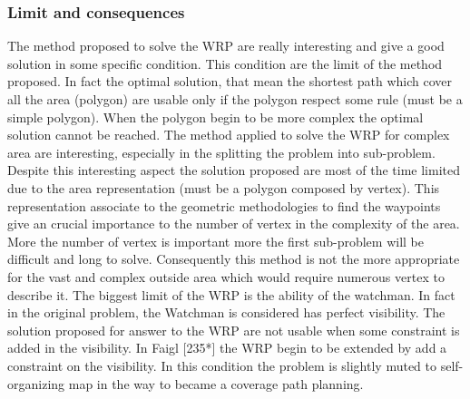 


\subsubsection{Limit and consequences}

The method proposed to solve the WRP are really interesting and give a good solution in some specific condition. This condition are the limit of the method proposed. In fact the optimal solution, that mean the shortest path which cover all the area (polygon) are usable only if the polygon respect some rule (must be a simple polygon).  
When the polygon begin to be more complex the optimal solution cannot be reached. The method applied to solve the WRP for complex area are interesting, especially in the splitting the problem into sub-problem. Despite this interesting aspect the solution proposed are most of the time limited due to the area representation (must be a polygon composed by vertex). This representation associate to the geometric methodologies to find the waypoints give an crucial importance to the number of vertex in the complexity of the area. More the number of vertex is important more the first sub-problem will be difficult and long to solve. 
Consequently this method is not the more appropriate for the vast and complex outside area which would require  numerous vertex to describe it.
 The biggest limit of the WRP is the ability of the watchman. In fact in the original problem, the Watchman is considered has perfect visibility. The solution proposed for answer to the WRP are not usable when some constraint is added in the  visibility. 
In Faigl [235*] the WRP begin to be extended by add a constraint on the visibility. In this condition the problem is slightly muted to self-organizing map  in the way to became  a coverage path planning.

